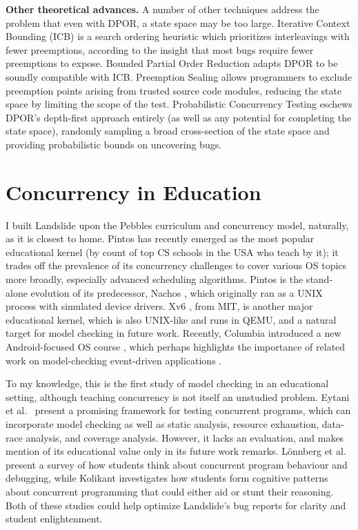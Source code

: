 {\bf Other theoretical advances.}
A number of other techniques address the problem that even with DPOR, a state space may be too large.
Iterative Context Bounding (ICB) \cite{chess-icb} is a search ordering heuristic which prioritizes interleavings with fewer preemptions,
according to the insight that most bugs require fewer preemptions to expose.
Bounded Partial Order Reduction \cite{bpor} adapts DPOR to be soundly compatible with ICB.
Preemption Sealing \cite{sealing} allows programmers to exclude preemption points arising from trusted source code modules,
reducing the state space by limiting the scope of the test.
Probabilistic Concurrency Testing \cite{randomized-scheduler} eschews DPOR's depth-first approach entirely (as well as any potential for completing the state space), randomly sampling a broad cross-section of the state space and providing probabilistic bounds on uncovering bugs.

\section{Concurrency in Education}

I built Landslide upon the Pebbles \cite{kspec} curriculum and concurrency model, naturally, as it is closest to home. %
Pintos \cite{pintos} has recently emerged as the most popular educational kernel
(by count of top CS schools in the USA who teach by it);
it trades off the prevalence of its concurrency challenges to cover various OS topics more broadly,
especially advanced scheduling algorithms.
Pintos is the stand-alone evolution of its predecessor, Nachos \cite{nachos}, which originally ran as a UNIX process with simulated device drivers.
%
Xv6 \cite{xv6}, from MIT, is another major educational kernel, which is also UNIX-like and runs in QEMU,
and a natural target for model checking in future work.
Recently, Columbia introduced a new Android-focused OS course \cite{teaching-android},
which perhaps highlights the importance of related work on model-checking event-driven applications \cite{r4}.

To my knowledge, this is the first study of model checking in an educational setting, although teaching concurrency is not itself an unstudied problem.
Eytani et al.~\cite{towards-a-framework} present a promising framework for testing concurrent programs,
which can incorporate model checking as well as static analysis, resource exhaustion, data-race analysis, and coverage analysis.
However, it lacks an evaluation, and makes mention of its educational value only in its future work remarks.
%
L\"{o}nnberg et al.~\cite{how-studence} present a survey of how students think about concurrent program behaviour and debugging,
while Kolikant \cite{learning-concurrency} investigates how students form cognitive patterns about concurrent programming that could either aid or stunt their reasoning.
Both of these studies could help optimize Landslide's bug reports for clarity and student enlightenment.



